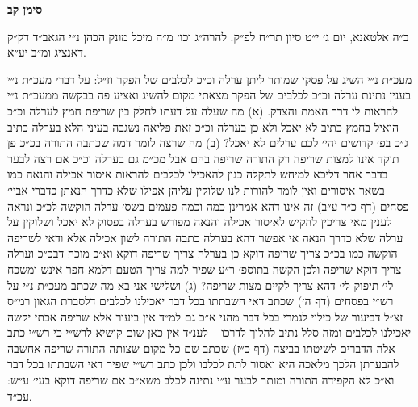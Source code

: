 \documentclass[12pt, openany]{book}
\newcommand{\chapname}{}
\newcommand{\newchap}[1]{
	\addcontentsline{toc}{chapter}{#1}
	\renewcommand{\chapname}{#1}
		\begin{center}
			\textbf{%
\fontsize{16pt}{16pt}\selectfont
				#1}
		\end{center}
}
\begin{document}
\newchap{סימן קב}
\begin{multicols}{2}
ב״ה אלטאנא, יום ג׳ י״ט סיון תר״ח לפ״ק. להרה״ג וכו׳ מ״ה מיכל מונק הכהן נ״י הגאב״ד דק״ק דאנציג ומ״ב יע״א.\\\vspace{0pt}

מעכ״ת נ״י השיג על פסקי שמותר ליתן ערלה וכ״כ לכלבים של הפקר וז״ל: על דברי מעכ״ת נ״י בענין נתינת ערלה וכ״כ לכלבים של הפקר מצאתי מקום להשיג ואציע פה בבקשה ממעכ״ת נ״י להראות לי דרך האמת והצדק. (א) מה שעלה על דעתו לחלק בין שריפת חמץ לערלה וכ״כ הואיל בחמץ כתיב לא יאכל ולא כן בערלה וכ״כ זאת פליאה נשגבה בעיני הלא בערלה כתיב ג״כ בפ׳ קדושים יהי׳ לכם ערלים לא יאכל? (ב) מה שרצה לומר דמה שכתבה התורה בכ״כ פן תוקד אינו למצות שריפה רק התורה שריפה בהם אבל מכ״מ גם בערלה וכ״כ אם רצה לבער בדבר אחר דליכא למיחש לתקלה כגון להאכילו לכלבים להראות איסור אכילה והנאה כמו בשאר איסורים ואין לומר להורות לנו שלוקין עליהן אפילו שלא כדרך הנאתן כדברי אביי׳ פסחים (דף כ״ד ע״ב) זה אינו דהא אמרינן כמה וכמה פעמים בשס׳ ערלה הוקשה לכ״כ ונראה לענין מאי צריכין להקיש לאיסור אכילה והנאה מפורש בערלה בפסוק לא יאכל ושלוקין על ערלה שלא כדרך הנאה אי אפשר דהא בערלה כתבה התורה לשון אכילה אלא ודאי לשריפה הוקשה כמו בכ״כ צריך שריפה דוקא כן בערלה צריך שריפה דוקא וא״כ מוכח דבכ״כ וערלה צריך דוקא שריפה ולכן הקשה בתוספ׳ ר״ע שפיר למה צריך הטעם דלמא חפר אינש ומשכח לי׳ תיפוק לי׳ דהא צריך לקיים מצות שריפה? (ג) ושלישי אני בא מה שכתב מעכ״ת נ״י על רש״י בפסחים (דף ה׳) שכתב דאי השבתתו בכל דבר יאכילנו לכלבים דלסברת הגאון רמ״ס זצ״ל דביעור של כילוי לגמרי בכל דבר מהני א״כ גם למ״ד אין ביעור אלא שריפה אכתי יקשה יאכילנו לכלבים ומזה סלל נתיב להלוך לדרכו – לענ״ד אין כאן שום קושיא לרש״י כי רש״י כתב אלה הדברים לשיטתו בביצה (דף כ״ז) שכתב שם כל מקום שצותה התורה שריפה אחשבה להבערתן הלכך מלאכה היא ואסור לתת לכלבו ולכן כתב רש״י שפיר דאי השבתתו בכל דבר וא״כ לא הקפידה התורה ומותר לבער ע״י נתינה לכלב משא״כ אם שריפה דוקא בעי׳ ע״ש: עכ״ד.\\\vspace{0pt}


\end{multicols}
\end{document}
